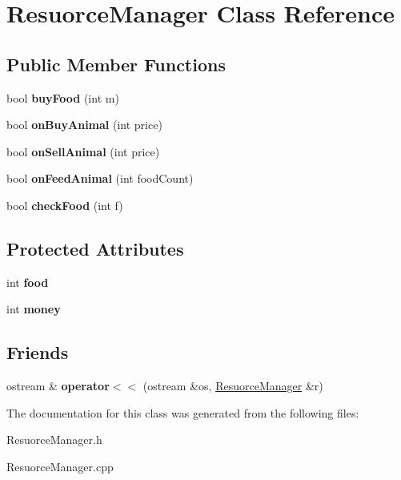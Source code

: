 \hypertarget{class_resuorce_manager}{}\section{Resuorce\+Manager Class Reference}
\label{class_resuorce_manager}
\subsection*{Public Member Functions}
\begin{DoxyCompactItemize}
\item 
\mbox{\label{class_resuorce_manager_ab695c8e1d5832a7c8584ab76eb5c7e96}} 
bool {\bfseries buy\+Food} (int m)
\item 
\mbox{\label{class_resuorce_manager_ac36a816e1164e3199e6f0747d9476e3c}} 
bool {\bfseries on\+Buy\+Animal} (int price)
\item 
\mbox{\label{class_resuorce_manager_ab534e16078bff88c9c77a017b4ee87c4}} 
bool {\bfseries on\+Sell\+Animal} (int price)
\item 
\mbox{\label{class_resuorce_manager_a2d14b617098ad105ad90fa135128f35f}} 
bool {\bfseries on\+Feed\+Animal} (int food\+Count)
\item 
\mbox{\label{class_resuorce_manager_ad7a562db6a0290a3f09705e226fcfff5}} 
bool {\bfseries check\+Food} (int f)
\end{DoxyCompactItemize}
\subsection*{Protected Attributes}
\begin{DoxyCompactItemize}
\item 
\mbox{\label{class_resuorce_manager_ab56d204cee3db3f1c0ecd49b457a6de0}} 
int {\bfseries food}
\item 
\mbox{\label{class_resuorce_manager_ab305ccf6a9c242ddfd736baeef1f7463}} 
int {\bfseries money}
\end{DoxyCompactItemize}
\subsection*{Friends}
\begin{DoxyCompactItemize}
\item 
\mbox{\label{class_resuorce_manager_aad53dd7ece0ac1d6fd4359b868cf2c6c}} 
ostream \& {\bfseries operator$<$$<$} (ostream \&os, \hyperlink{class_resuorce_manager}{Resuorce\+Manager} \&r)
\end{DoxyCompactItemize}


The documentation for this class was generated from the following files\+:\begin{DoxyCompactItemize}
\item 
Resuorce\+Manager.\+h\item 
Resuorce\+Manager.\+cpp\end{DoxyCompactItemize}
